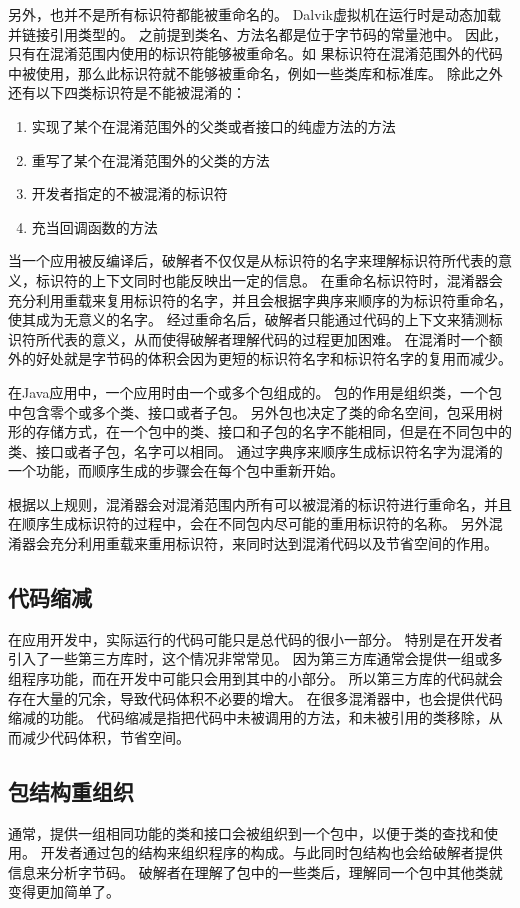 另外，也并不是所有标识符都能被重命名的。
Dalvik虚拟机在运行时是动态加载并链接引用类型的。
之前提到类名、方法名都是位于字节码的常量池中。
因此，只有在混淆范围内使用的标识符能够被重命名。如
果标识符在混淆范围外的代码中被使用，那么此标识符就不能够被重命名，例如一些类库和标准库。
除此之外还有以下四类标识符是不能被混淆的：
\begin{enumerate}
	\item 实现了某个在混淆范围外的父类或者接口的纯虚方法的方法
	\item 重写了某个在混淆范围外的父类的方法
	\item 开发者指定的不被混淆的标识符
	\item 充当回调函数的方法
\end{enumerate}
当一个应用被反编译后，破解者不仅仅是从标识符的名字来理解标识符所代表的意义，标识符的上下文同时也能反映出一定的信息。
在重命名标识符时，混淆器会充分利用重载来复用标识符的名字，并且会根据字典序来顺序的为标识符重命名，使其成为无意义的名字。
经过重命名后，破解者只能通过代码的上下文来猜测标识符所代表的意义，从而使得破解者理解代码的过程更加困难。
在混淆时一个额外的好处就是字节码的体积会因为更短的标识符名字和标识符名字的复用而减少。

在Java应用中，一个应用时由一个或多个包组成的。
包的作用是组织类，一个包中包含零个或多个类、接口或者子包。
另外包也决定了类的命名空间，包采用树形的存储方式，在一个包中的类、接口和子包的名字不能相同，但是在不同包中的类、接口或者子包，名字可以相同。
通过字典序来顺序生成标识符名字为混淆的一个功能，而顺序生成的步骤会在每个包中重新开始。

根据以上规则，混淆器会对混淆范围内所有可以被混淆的标识符进行重命名，并且在顺序生成标识符的过程中，会在不同包内尽可能的重用标识符的名称。
另外混淆器会充分利用重载来重用标识符，来同时达到混淆代码以及节省空间的作用。

\subsection{代码缩减}

在应用开发中，实际运行的代码可能只是总代码的很小一部分。
特别是在开发者引入了一些第三方库时，这个情况非常常见。
因为第三方库通常会提供一组或多组程序功能，而在开发中可能只会用到其中的小部分。
所以第三方库的代码就会存在大量的冗余，导致代码体积不必要的增大。
在很多混淆器中，也会提供代码缩减的功能。
代码缩减是指把代码中未被调用的方法，和未被引用的类移除，从而减少代码体积，节省空间。

\subsection{包结构重组织}
通常，提供一组相同功能的类和接口会被组织到一个包中，以便于类的查找和使用。
开发者通过包的结构来组织程序的构成。与此同时包结构也会给破解者提供信息来分析字节码。
破解者在理解了包中的一些类后，理解同一个包中其他类就变得更加简单了。

